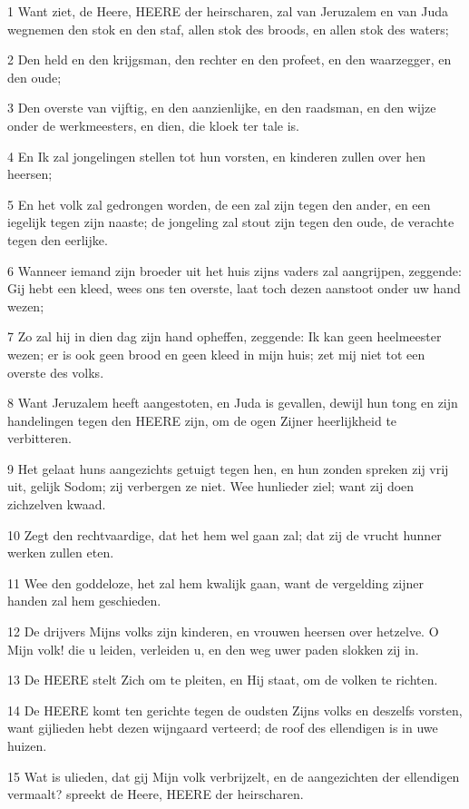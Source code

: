 \par 1 Want ziet, de Heere, HEERE der heirscharen, zal van Jeruzalem en van Juda wegnemen den stok en den staf, allen stok des broods, en allen stok des waters;
\par 2 Den held en den krijgsman, den rechter en den profeet, en den waarzegger, en den oude;
\par 3 Den overste van vijftig, en den aanzienlijke, en den raadsman, en den wijze onder de werkmeesters, en dien, die kloek ter tale is.
\par 4 En Ik zal jongelingen stellen tot hun vorsten, en kinderen zullen over hen heersen;
\par 5 En het volk zal gedrongen worden, de een zal zijn tegen den ander, en een iegelijk tegen zijn naaste; de jongeling zal stout zijn tegen den oude, de verachte tegen den eerlijke.
\par 6 Wanneer iemand zijn broeder uit het huis zijns vaders zal aangrijpen, zeggende: Gij hebt een kleed, wees ons ten overste, laat toch dezen aanstoot onder uw hand wezen;
\par 7 Zo zal hij in dien dag zijn hand opheffen, zeggende: Ik kan geen heelmeester wezen; er is ook geen brood en geen kleed in mijn huis; zet mij niet tot een overste des volks.
\par 8 Want Jeruzalem heeft aangestoten, en Juda is gevallen, dewijl hun tong en zijn handelingen tegen den HEERE zijn, om de ogen Zijner heerlijkheid te verbitteren.
\par 9 Het gelaat huns aangezichts getuigt tegen hen, en hun zonden spreken zij vrij uit, gelijk Sodom; zij verbergen ze niet. Wee hunlieder ziel; want zij doen zichzelven kwaad.
\par 10 Zegt den rechtvaardige, dat het hem wel gaan zal; dat zij de vrucht hunner werken zullen eten.
\par 11 Wee den goddeloze, het zal hem kwalijk gaan, want de vergelding zijner handen zal hem geschieden.
\par 12 De drijvers Mijns volks zijn kinderen, en vrouwen heersen over hetzelve. O Mijn volk! die u leiden, verleiden u, en den weg uwer paden slokken zij in.
\par 13 De HEERE stelt Zich om te pleiten, en Hij staat, om de volken te richten.
\par 14 De HEERE komt ten gerichte tegen de oudsten Zijns volks en deszelfs vorsten, want gijlieden hebt dezen wijngaard verteerd; de roof des ellendigen is in uwe huizen.
\par 15 Wat is ulieden, dat gij Mijn volk verbrijzelt, en de aangezichten der ellendigen vermaalt? spreekt de Heere, HEERE der heirscharen.

